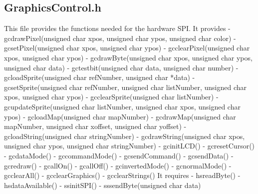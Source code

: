 \subsection{GraphicsControl.h}
\par This file provides the functions needed for the hardware SPI.
It provides
	- gc\textunderscore drawPixel(unsigned char xpos, unsigned char ypos, unsigned char color)
	- gc\textunderscore setPixel(unsigned char xpos, unsigned char ypos)
	- gc\textunderscore clearPixel(unsigned char xpos, unsigned char ypos)
	- gc\textunderscore drawByte(unsigned char xpos, unsigned char ypos, unsigned char data)
	- gc\textunderscore testbit(unsigned char data, unsigned char number)
	- gc\textunderscore loadSprite(unsigned char refNumber, unsigned char *data)
	- gc\textunderscore setSprite(unsigned char refNumber, unsigned char listNumber, unsigned char xpos, unsigned char ypos)
	- gc\textunderscore clearSprite(unsigned char listNumber)
	- gc\textunderscore updateSprite(unsigned char listNumber, unsigned char xpos, unsigned char ypos)
	- gc\textunderscore loadMap(unsigned char mapNumber)
	- gc\textunderscore drawMap(unsigned char mapNumber, unsigned char xoffset, unsigned char yoffset)
	- gc\textunderscore loadString(unsigned char stringNumber)
	- gc\textunderscore drawString(unsigned char xpos, unsigned char ypos, unsigned char stringNumber)
	- gc\textunderscore initLCD()
	- gc\textunderscore resetCursor()
	- gc\textunderscore dataMode()
	- gc\textunderscore commandMode()
	- gc\textunderscore sendCommand()
	- gc\textunderscore sendData()
	- gc\textunderscore redraw()
	- gc\textunderscore allOn()
	- gc\textunderscore allOff()
	- gc\textunderscore invertedMode()
	- gc\textunderscore normalMode()
	- gc\textunderscore clearAll()
	- gc\textunderscore clearGraphics()
	- gc\textunderscore clearStrings()
It requires
	- hs\textunderscore readByte()
	- hs\textunderscore dataAvailable()
	- ss\textunderscore initSPI()
	- ss\textunderscore sendByte(unsigned char data)

